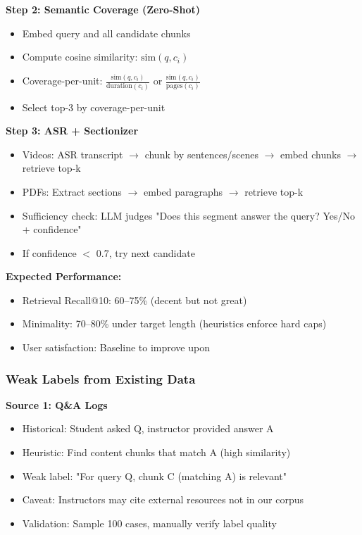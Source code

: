 \documentclass[11pt,letterpaper]{article}
\begin{document}
\textbf{Step 2: Semantic Coverage (Zero-Shot)}
\begin{itemize}
\item Embed query and all candidate chunks
\item Compute cosine similarity: $\text{sim}(q, c_i)$
\item Coverage-per-unit: $\frac{\text{sim}(q, c_i)}{\text{duration}(c_i)}$ or $\frac{\text{sim}(q, c_i)}{\text{pages}(c_i)}$
\item Select top-3 by coverage-per-unit
\end{itemize}

\textbf{Step 3: ASR + Sectionizer}
\begin{itemize}
\item Videos: ASR transcript $\rightarrow$ chunk by sentences/scenes $\rightarrow$ embed chunks $\rightarrow$ retrieve top-k
\item PDFs: Extract sections $\rightarrow$ embed paragraphs $\rightarrow$ retrieve top-k
\item Sufficiency check: LLM judges "Does this segment answer the query? Yes/No + confidence"
\item If confidence $<$ 0.7, try next candidate
\end{itemize}

\textbf{Expected Performance:}
\begin{itemize}
\item Retrieval Recall@10: 60--75\% (decent but not great)
\item Minimality: 70--80\% under target length (heuristics enforce hard caps)
\item User satisfaction: Baseline to improve upon
\end{itemize}

\subsubsection{Weak Labels from Existing Data}\label{subsubsec:weak-labels}

\textbf{Source 1: Q\&A Logs}
\begin{itemize}
\item Historical: Student asked Q, instructor provided answer A
\item Heuristic: Find content chunks that match A (high similarity)
\item Weak label: "For query Q, chunk C (matching A) is relevant"
\item Caveat: Instructors may cite external resources not in our corpus
\item Validation: Sample 100 cases, manually verify label quality
\end{itemize}
\end{document}
